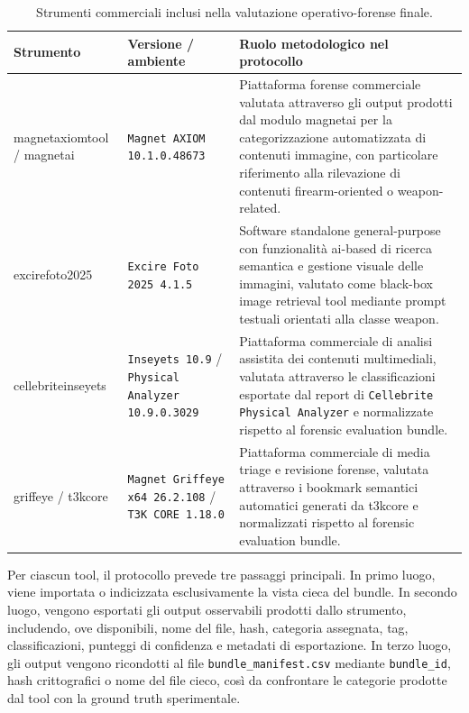 \begin{table}[H]
\centering
\caption{Strumenti commerciali inclusi nella valutazione operativo-forense finale.}
\label{tab:methodology-forensic-tools}
\footnotesize
\renewcommand{\arraystretch}{1.15}
\begin{tabularx}{\textwidth}{@{}L{3.5cm}L{3.4cm}X@{}}
\toprule
\textbf{Strumento} & \textbf{Versione / ambiente} & \textbf{Ruolo metodologico nel protocollo} \\
\midrule
\gls{magnetaxiomtool} / \gls{magnetai}
&
\texttt{Magnet AXIOM 10.1.0.48673}
&
Piattaforma forense commerciale valutata attraverso gli output prodotti dal modulo \gls{magnetai} per la categorizzazione automatizzata di contenuti immagine, con particolare riferimento alla rilevazione di contenuti firearm-oriented o weapon-related. \\
\gls{excirefoto2025}
&
\texttt{Excire Foto 2025 4.1.5}
&
Software standalone general-purpose con funzionalità \gls{ai}-based di ricerca semantica e gestione visuale delle immagini, valutato come black-box image retrieval tool mediante prompt testuali orientati alla classe weapon. \\
\gls{cellebriteinseyets}
&
\texttt{Inseyets 10.9} / \texttt{Physical Analyzer 10.9.0.3029}
&
Piattaforma commerciale di analisi assistita dei contenuti multimediali, valutata attraverso le classificazioni esportate dal report di \texttt{Cellebrite Physical Analyzer} e normalizzate rispetto al forensic evaluation bundle. \\
\gls{griffeye} / \gls{t3kcore}
&
\texttt{Magnet Griffeye x64 26.2.108} / \texttt{T3K CORE 1.18.0}
&
Piattaforma commerciale di media triage e revisione forense, valutata attraverso i bookmark semantici automatici generati da \gls{t3kcore} e normalizzati rispetto al forensic evaluation bundle. \\
\bottomrule
\end{tabularx}
\end{table}

Per ciascun tool, il protocollo prevede tre passaggi principali. In primo luogo, viene importata o indicizzata esclusivamente la vista cieca del bundle. In secondo luogo, vengono esportati gli output osservabili prodotti dallo strumento, includendo, ove disponibili, nome del file, hash, categoria assegnata, tag, classificazioni, punteggi di confidenza e metadati di esportazione. In terzo luogo, gli output vengono ricondotti al file \texttt{bundle\_manifest.csv} mediante \texttt{bundle\_id}, hash crittografici o nome del file cieco, così da confrontare le categorie prodotte dal tool con la ground truth sperimentale.



